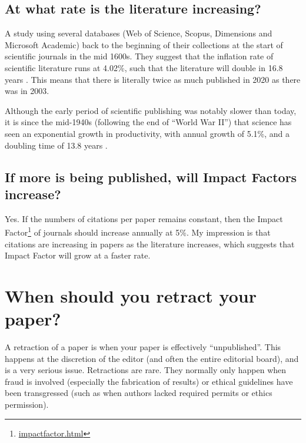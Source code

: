 \documentclass[
]{krantz}
\renewcommand{\href}[2]{#2\footnote{\url{#1}}}
\begin{document}
\hypertarget{at-what-rate-is-the-literature-increasing}{%
\section{At what rate is the literature increasing?}\label{at-what-rate-is-the-literature-increasing}}

A study using several databases (Web of Science, Scopus, Dimensions and Microsoft Academic) back to the beginning of their collections at the start of scientific journals in the mid 1600s. They suggest that the inflation rate of scientific literature runs at 4.02\%, such that the literature will double in 16.8 years \citep{bornmann2020growth}. This means that there is literally twice as much published in 2020 as there was in 2003.

Although the early period of scientific publishing was notably slower than today, it is since the mid-1940s (following the end of ``World War II'') that science has seen an exponential growth in productivity, with annual growth of 5.1\%, and a doubling time of 13.8 years \citep{bornmann2020growth}.

\hypertarget{if-more-is-being-published-will-impact-factors-increase}{%
\section{If more is being published, will Impact Factors increase?}\label{if-more-is-being-published-will-impact-factors-increase}}

Yes. If the numbers of citations per paper remains constant, then the \href{impactfactor.html}{Impact Factor} of journals should increase annually at 5\%. My impression is that citations are increasing in papers as the literature increases, which suggests that Impact Factor will grow at a faster rate.

\hypertarget{retract}{%
\chapter{When should you retract your paper?}\label{retract}}

A retraction of a paper is when your paper is effectively ``unpublished''. This happens at the discretion of the editor (and often the entire editorial board), and is a very serious issue. Retractions are rare. They normally only happen when fraud is involved (especially the fabrication of results) or ethical guidelines have been transgressed (such as when authors lacked required permits or ethics permission).
\end{document}
